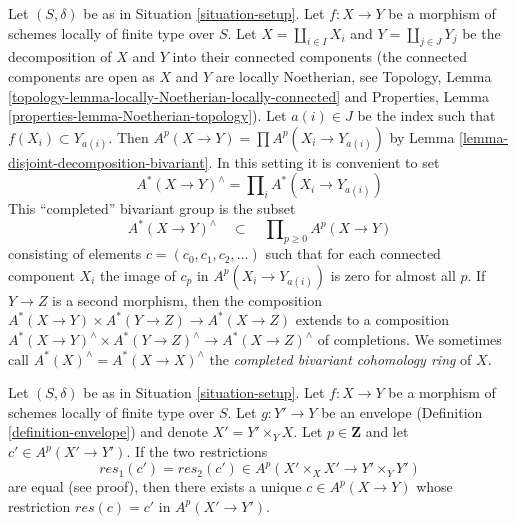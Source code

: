 \begin{remark}
\label{remark-completion-bivariant}
Let $(S, \delta)$ be as in Situation \ref{situation-setup}.
Let $f : X \to Y$ be a morphism of schemes locally of finite type over $S$.
Let $X = \coprod_{i \in I} X_i$ and $Y = \coprod_{j \in J} Y_j$
be the decomposition of $X$ and $Y$ into their connected components
(the connected components are open as $X$ and $Y$ are locally Noetherian, see
Topology, Lemma \ref{topology-lemma-locally-Noetherian-locally-connected} and
Properties, Lemma \ref{properties-lemma-Noetherian-topology}).
Let $a(i) \in J$ be the index such that $f(X_i) \subset Y_{a(i)}$.
Then $A^p(X \to Y) = \prod A^p(X_i \to Y_{a(i)})$ by
Lemma \ref{lemma-disjoint-decomposition-bivariant}.
In this setting it is convenient to set
$$
A^*(X \to Y)^\wedge = \prod\nolimits_i A^*(X_i \to Y_{a(i)})
$$
This ``completed'' bivariant group is the subset
$$
A^*(X \to Y)^\wedge \quad\subset\quad \prod\nolimits_{p \geq 0} A^p(X \to Y)
$$
consisting of elements $c = (c_0, c_1, c_2, \ldots)$ such that
for each connected component $X_i$ the image of $c_p$ in
$A^p(X_i \to Y_{a(i)})$ is zero for almost all $p$.
If $Y \to Z$ is a second morphism, then the
composition $A^*(X \to Y) \times A^*(Y \to Z) \to A^*(X \to Z)$
extends to a composition
$A^*(X \to Y)^\wedge \times A^*(Y \to Z)^\wedge \to A^*(X \to Z)^\wedge$
of completions. 
We sometimes call $A^*(X)^\wedge = A^*(X \to X)^\wedge$ the
{\it completed bivariant cohomology ring} of $X$.
\end{remark}

\begin{lemma}
\label{lemma-envelope-bivariant}
Let $(S, \delta)$ be as in Situation \ref{situation-setup}.
Let $f : X \to Y$ be a morphism of schemes locally of finite type over $S$.
Let $g : Y' \to Y$ be an envelope (Definition \ref{definition-envelope})
and denote $X' = Y' \times_Y X$. Let $p \in \mathbf{Z}$ and let
$c' \in A^p(X' \to Y')$. If the two restrictions
$$
res_1(c') = res_2(c') \in A^p(X' \times_X X' \to Y' \times_Y Y')
$$
are equal (see proof), then there exists a unique $c \in A^p(X \to Y)$
whose restriction $res(c) = c'$ in $A^p(X' \to Y')$.
\end{lemma}

